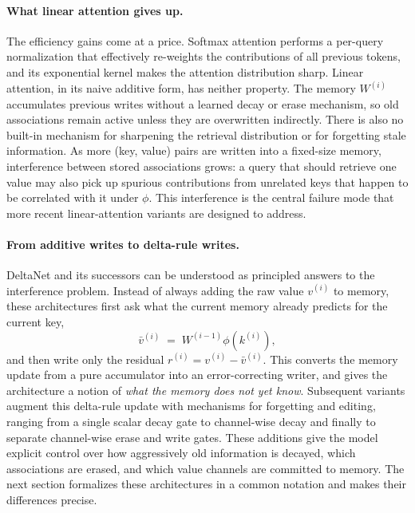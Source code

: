 \documentclass{article}
\newcommand{\phiMap}{\phi}
\begin{document}
\paragraph{What linear attention gives up.}
The efficiency gains come at a price. Softmax attention performs a per-query normalization that effectively re-weights the contributions of all previous tokens, and its exponential kernel makes the attention distribution sharp. Linear attention, in its naive additive form, has neither property. The memory $W^{(i)}$ accumulates previous writes without a learned decay or erase mechanism, so old associations remain active unless they are overwritten indirectly. There is also no built-in mechanism for sharpening the retrieval distribution or for forgetting stale information. As more (key, value) pairs are written into a fixed-size memory, interference between stored associations grows: a query that should retrieve one value may also pick up spurious contributions from unrelated keys that happen to be correlated with it under $\phiMap$. This interference is the central failure mode that more recent linear-attention variants are designed to address.

\paragraph{From additive writes to delta-rule writes.}
DeltaNet and its successors can be understood as principled answers to the interference problem. Instead of always adding the raw value $v^{(i)}$ to memory, these architectures first ask what the current memory already predicts for the current key,
\begin{equation}
\bar v^{(i)} \;=\; W^{(i-1)} \phiMap\!\left(k^{(i)}\right),
\end{equation}
and then write only the residual $r^{(i)} = v^{(i)} - \bar v^{(i)}$. This converts the memory update from a pure accumulator into an error-correcting writer, and gives the architecture a notion of \emph{what the memory does not yet know}. Subsequent variants augment this delta-rule update with mechanisms for forgetting and editing, ranging from a single scalar decay gate to channel-wise decay and finally to separate channel-wise erase and write gates. These additions give the model explicit control over how aggressively old information is decayed, which associations are erased, and which value channels are committed to memory. The next section formalizes these architectures in a common notation and makes their differences precise.
\end{document}
